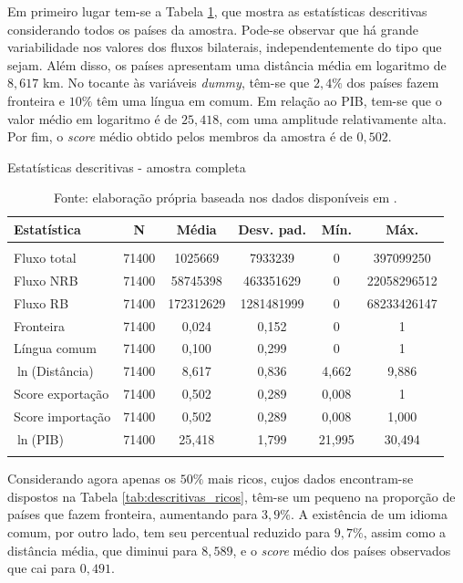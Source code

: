 Em primeiro lugar tem-se a Tabela \ref{tab:descritivas_total}, que mostra as estatísticas descritivas considerando todos os países da amostra. Pode-se observar que há grande variabilidade nos valores dos fluxos bilaterais, independentemente do tipo que sejam. Além disso, os países apresentam uma distância média em logaritmo de $8,617$ km. No tocante às variáveis \textit{dummy}, têm-se que $2,4\%$ dos países fazem fronteira e $10\%$ têm uma língua em comum. Em relação ao PIB, tem-se que o valor médio em logaritmo é de $25,418$, com uma amplitude relativamente alta. Por fim, o \textit{score} médio obtido pelos membros da amostra é de $0,502$.

\begin{table}[H] 
	\centering 
	\caption{Estatísticas descritivas - amostra completa} 
	\label{tab:descritivas_total} 
	\begin{tabular}{@{\extracolsep{5pt}}lccccc} 
		\\[-1.8ex]\toprule 
		Estatística & \multicolumn{1}{c}{N} & \multicolumn{1}{c}{Média} & \multicolumn{1}{c}{Desv. pad.} & \multicolumn{1}{c}{Mín.} &  \multicolumn{1}{c}{Máx.} \\ 
		\midrule \\[-1.8ex] 
		Fluxo total & 71400 & 1025669 & 7933239 & 0 & 397099250 \\ 
		Fluxo NRB & 71400 & 58745398 & 463351629 & 0 &  22058296512 \\ 
		Fluxo RB & 71400 & 172312629 & 1281481999 & 0 &  68233426147 \\ 
		Fronteira & 71400 & 0,024 & 0,152 & 0 & 1 \\ 
		Língua comum & 71400 & 0,100 & 0,299 & 0 & 1 \\ 
		$\ln$(Distância) & 71400 & 8,617 & 0,836 & 4,662 & 9,886 \\ 
		Score exportação & 71400 & 0,502 & 0,289 & 0,008 &  1 \\ 
		Score importação & 71400 & 0,502 & 0,289 & 0,008 &  1,000 \\
		$\ln$(PIB) & 71400 & 25,418 & 1,799 & 21,995 & 30,494 \\ \bottomrule \\[-1.8ex] 
	\end{tabular}
\caption*{\RaggedRight  Fonte: elaboração própria baseada nos dados disponíveis em \cite{Cepii2019, Comtrade2019, WorldBank2019}.}
\end{table} 
Considerando agora apenas os $50\%$ mais ricos, cujos dados encontram-se dispostos na Tabela \ref{tab:descritivas_ricos}, têm-se um pequeno na proporção de países que fazem fronteira, aumentando para $3,9\%$. A existência de um idioma comum, por outro lado, tem seu percentual reduzido para $9,7\%$, assim como a distância média, que diminui para $8,589$, e o \textit{score} médio dos países observados que cai para $0,491$. 


